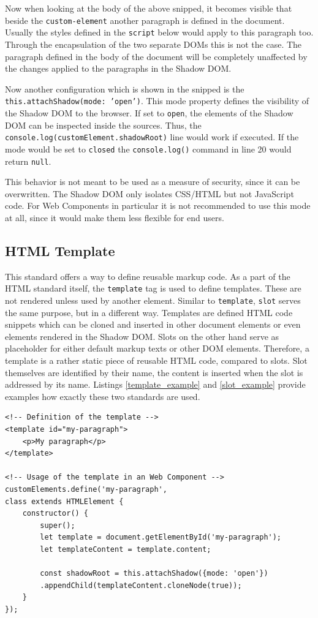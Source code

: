 Now when looking at the body of the above snipped, it becomes visible that beside the \texttt{custom-element} another paragraph is defined in the document. Usually the styles defined in the \texttt{script} below would apply to this paragraph too. Through the encapsulation of the two separate DOMs this is not the case. The paragraph defined in the body of the document will be completely unaffected by the changes applied to the paragraphs in the Shadow DOM.\cite{simon_thesis}

Now another configuration which is shown in the snipped is the \texttt{this.attachShadow({mode: 'open'})}. This mode property defines the visibility of the Shadow DOM to the browser. If set to \texttt{open}, the elements of the Shadow DOM can be inspected inside the sources. Thus, the \texttt{console.log(customElement.shadowRoot)} line would work if executed. 
If the mode would be set to \texttt{closed}  the \texttt{console.log()} command in line 20 would return \texttt{null}.\cite{simon_thesis}

This behavior is not meant to be used as a measure of security, since it can be overwritten. The Shadow DOM only isolates CSS/HTML but not JavaScript code. For Web Components in particular it is not recommended to use this mode at all, since it would make them less flexible for end users.\cite{wc_shadow_dom_google}

\subsection{HTML Template}

This standard offers a way to define reusable markup code. As a part of the HTML standard itself, the \texttt{template} tag is used to define templates. These are not rendered unless used by another element. Similar to \texttt{template}, \texttt{slot} serves the same purpose, but in a different way. Templates are defined HTML code snippets which can be cloned and inserted in other document elements or even elements rendered in the Shadow DOM.
Slots on the other hand serve as placeholder for either default markup texts or other DOM elements. Therefore, a template is a rather static piece of reusable HTML code, compared to slots.
Slot themselves are identified by their name, the content is inserted when the slot is addressed by its name.
Listings \ref{template_example} and \ref{slot_example} provide examples how exactly these two standards are used. \cite{wc_html_template_slots}

\begin{lstlisting}[caption=Definition and usage of the \texttt{template} standard \cite{wc_html_template_slots}, label=template_example]
<!-- Definition of the template -->
<template id="my-paragraph">
	<p>My paragraph</p>
</template>

<!-- Usage of the template in an Web Component -->
customElements.define('my-paragraph',
class extends HTMLElement {
	constructor() {
		super();
		let template = document.getElementById('my-paragraph');
		let templateContent = template.content;
		
		const shadowRoot = this.attachShadow({mode: 'open'})
		.appendChild(templateContent.cloneNode(true));
	}
});
\end{lstlisting}

